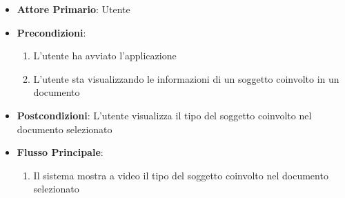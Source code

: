 \begin{itemize}
    \item \textbf{Attore Primario}: Utente
    \item \textbf{Precondizioni}:
    \begin{enumerate}
        \item L'utente ha avviato l'applicazione
        \item L'utente sta visualizzando le informazioni di un soggetto coinvolto in un documento
    \end{enumerate}
    \item \textbf{Postcondizioni}: L'utente visualizza il tipo del soggetto coinvolto nel documento selezionato
    \item \textbf{Flusso Principale}:
        \begin{enumerate}
            \item Il sistema mostra a video il tipo del soggetto coinvolto nel documento selezionato
        \end{enumerate}
\end{itemize}



